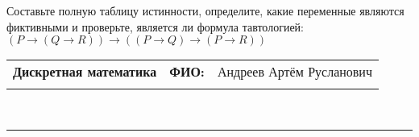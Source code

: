 \documentclass[10pt]{exam}
\newcommand{\class}{Дискретная математика}
\newcommand{\examdate}{}
\begin{document}
\begin{questions}
\begin{enumerate} [a)]
\end{enumerate}\question Составьте полную таблицу истинности, определите, какие переменные являются фиктивными и проверьте, является ли формула тавтологией:
$(P \rightarrow (Q \rightarrow R)) \rightarrow ((P \rightarrow Q) \rightarrow (P \rightarrow R))$

\end{questions}
\newpage
\begin{flushright}
\begin{tabular}{p{2.8in} r l}
\textbf{\class} & \textbf{ФИО:} &Андреев Артём Русланович
\\

\textbf{\examdate} &&\\
\end{tabular}\\
\end{flushright}
\rule[1ex]{\textwidth}{.1pt}
\end{document}
